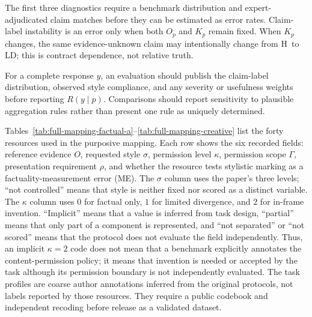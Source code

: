 \documentclass{clv2025}
\newcommand{\LD}{\textsc{LD}}
\newcommand{\Hall}{\textsc{H}}
\begin{document}
The first three diagnostics require a benchmark distribution and expert-adjudicated claim matches before they can be estimated as error rates.
Claim-label instability is an error only when both $O_p$ and $K_p$ remain fixed.
When $K_p$ changes, the same evidence-unknown claim may intentionally change from \Hall\ to \LD; this is contract dependence, not relative truth.

For a complete response $y$, an evaluation should publish the claim-label distribution, observed style compliance, and any severity or usefulness weights before reporting $R(y\mid p)$.
Comparisons should report sensitivity to plausible aggregation rules rather than present one rule as uniquely determined.

%
\makeatletter\def\@currentlabel{B}\makeatother\label{app:mapping}
\renewcommand*{\theHtable}{B.\arabic{table}}

Tables~\ref{tab:full-mapping-factual-a}--\ref{tab:full-mapping-creative} list the forty resources used in the purposive mapping.
Each row shows the six recorded fields: reference evidence $O$, requested style $\sigma$, permission level $\kappa$, permission scope $\Gamma$, presentation requirement $\rho$, and whether the resource tests stylistic marking as a factuality-measurement error (ME).
The $\sigma$ column uses the paper's three levels; ``not controlled'' means that style is neither fixed nor scored as a distinct variable.
The $\kappa$ column uses $0$ for factual only, $1$ for limited divergence, and $2$ for in-frame invention.
``Implicit'' means that a value is inferred from task design, ``partial'' means that only part of a component is represented, and ``not separated'' or ``not scored'' means that the protocol does not evaluate the field independently.
Thus, an implicit $\kappa=2$ code does not mean that a benchmark explicitly annotates the content-permission policy; it means that invention is needed or accepted by the task although its permission boundary is not independently evaluated.
The task profiles are coarse author annotations inferred from the original protocols, not labels reported by those resources.
They require a public codebook and independent recoding before release as a validated dataset.
\end{document}
